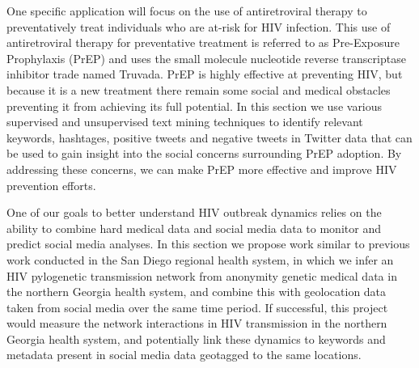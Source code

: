 



One specific application will focus on the use of antiretroviral therapy to preventatively treat individuals who are at-risk for HIV infection. This use of antiretroviral therapy for preventative treatment is referred to as Pre-Exposure Prophylaxis (PrEP) and uses the small molecule nucleotide reverse transcriptase inhibitor trade named Truvada. PrEP is highly effective at preventing HIV, but because it is a new treatment there remain some social and medical obstacles preventing it from achieving its full potential. In this section we use various supervised and unsupervised text mining techniques to identify relevant keywords, hashtages, positive tweets and negative tweets in Twitter data that can be used to gain insight into the social concerns surrounding PrEP adoption. By addressing these concerns, we can make PrEP more effective and improve HIV prevention efforts.

One of our goals to better understand HIV outbreak dynamics relies on the ability to combine hard medical data and social media data to monitor and predict social media analyses. In this section we propose work similar to previous work conducted in the San Diego regional health system, in which we infer an HIV pylogenetic transmission network from anonymity genetic medical data in the northern Georgia health system, and combine this with geolocation data taken from social media over the same time period. If successful, this project would measure the network interactions in HIV transmission in the northern Georgia health system, and potentially link these dynamics to keywords and metadata present in social media data geotagged to the same locations.


